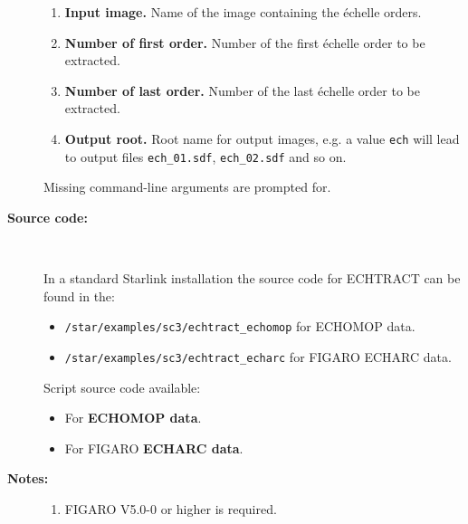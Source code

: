 \documentclass[twoside,11pt]{article}
\newcommand{\htmlref}[2]{#1}
\newcommand{\xref}[3]{#1}
\begin{document}
\begin{description}
\begin{enumerate}
\item {\bf Input image.}
      Name of the image containing the \'{e}chelle orders.

\item {\bf Number of first order.}
      Number of the first \'{e}chelle order to be extracted.

\item {\bf Number of last order.}
      Number of the last \'{e}chelle order to be extracted.

\item {\bf Output root.}
      Root name for output images, e.g. a value \verb+ech+ will
      lead to output files \verb+ech_01.sdf+, \verb+ech_02.sdf+
      and so on.

\end{enumerate}

     Missing command-line arguments are prompted for.

\item [{\bf Source code:}] \mbox{} \\
\begin{latex}
In a standard Starlink installation the source code for ECHTRACT can be found
in the:
\begin{itemize}

\item {\tt /star/examples/sc3/echtract\_echomop} for ECHOMOP data.

\item {\tt /star/examples/sc3/echtract\_echarc} for FIGARO ECHARC data.

\end{itemize}
\end{latex}
\begin{htmlonly}
      Script source code available:
\begin{itemize}

\item For \htmlref{{\bf ECHOMOP data}}{se_echtract_echomop_source}.

\item For FIGARO \htmlref{{\bf ECHARC data}}{se_echtract_echarc_source}.

\end{itemize}
\end{htmlonly}

\item [{\bf Notes:}] \mbox{}
\begin{enumerate}
\item \xref{FIGARO}{sun86}{} V5.0-0 or higher is required.


\end{enumerate}
\end{description}
\end{document}
